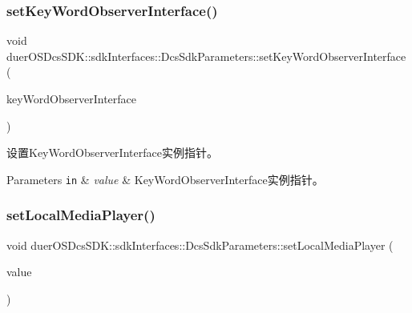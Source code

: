 \subsubsection{\texorpdfstring{set\+Key\+Word\+Observer\+Interface()}{setKeyWordObserverInterface()}}
{\footnotesize\ttfamily void duer\+O\+S\+Dcs\+S\+D\+K\+::sdk\+Interfaces\+::\+Dcs\+Sdk\+Parameters\+::set\+Key\+Word\+Observer\+Interface (\begin{DoxyParamCaption}\item[{std\+::shared\+\_\+ptr$<$ \hyperlink{classduerOSDcsSDK_1_1sdkInterfaces_1_1KeyWordObserverInterface}{sdk\+Interfaces\+::\+Key\+Word\+Observer\+Interface} $>$}]{key\+Word\+Observer\+Interface }\end{DoxyParamCaption})\hspace{0.3cm}{\ttfamily [inline]}}



设置\+Key\+Word\+Observer\+Interface实例指针。 


\begin{DoxyParams}[1]{Parameters}
\mbox{\tt in}  & {\em value} & Key\+Word\+Observer\+Interface实例指针。 \\
\hline
\end{DoxyParams}
\mbox{\label{structduerOSDcsSDK_1_1sdkInterfaces_1_1DcsSdkParameters_a02a6263c432994bf0acb036e4ed6d7c7}} 
\subsubsection{\texorpdfstring{set\+Local\+Media\+Player()}{setLocalMediaPlayer()}}
{\footnotesize\ttfamily void duer\+O\+S\+Dcs\+S\+D\+K\+::sdk\+Interfaces\+::\+Dcs\+Sdk\+Parameters\+::set\+Local\+Media\+Player (\begin{DoxyParamCaption}\item[{std\+::shared\+\_\+ptr$<$ \hyperlink{classduerOSDcsSDK_1_1sdkInterfaces_1_1LocalMediaPlayerInterface}{Local\+Media\+Player\+Interface} $>$}]{value }\end{DoxyParamCaption})\hspace{0.3cm}{\ttfamily [inline]}}



